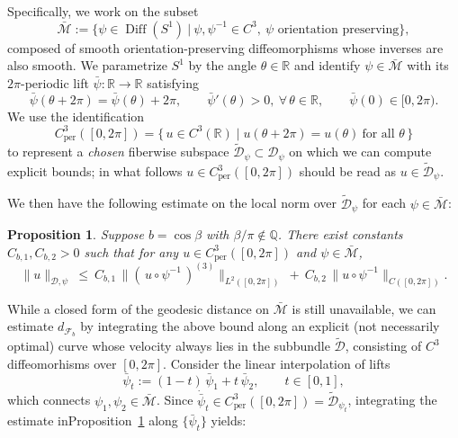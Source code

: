 \documentclass[12pt]{amsart}
\numberwithin{equation}{section}
\newtheorem{proposition}{Proposition}[section]
\theoremstyle{remark}
\begin{document}
Specifically, we work on the subset
\[
\bar{\mathcal M}:=\big\{\psi\in \operatorname{Diff}(S^1)\ \big|\ \psi,\psi^{-1}\in C^3,\ \psi \text{ orientation preserving}\big\},
\]
composed of smooth orientation-preserving diffeomorphisms whose inverses are also smooth.
We parametrize \(S^1\) by the angle \(\theta\in\mathbb R\) and identify \(\psi\in\bar{\mathcal M}\) with its \(2\pi\)-periodic lift \(\bar\psi:\mathbb R\to\mathbb R\) satisfying
\begin{equation}
\bar\psi(\theta+2\pi)=\bar\psi(\theta)+2\pi,\qquad \bar\psi'(\theta)>0,\ \forall\,\theta\in\mathbb R,\qquad \bar\psi(0)\in[0,2\pi).
\end{equation}
We use the identification
\begin{equation}
C_{\operatorname{per}}^3([0,2\pi])=\{\,u\in C^3(\mathbb R)\mid u(\theta+2\pi)=u(\theta)\ \text{for all }\theta\,\}
\end{equation}
to represent a \emph{chosen} fiberwise subspace \(\widetilde{\mathcal D}_\psi\subset \mathcal D_\psi\) on which we can compute explicit bounds; in what follows \(u\in C_{\operatorname{per}}^3([0,2\pi])\) should be read as \(u\in \widetilde{\mathcal D}_\psi\).

We then have the following estimate on the local norm over \(\widetilde{\mathcal D}_\psi\) for each \(\psi\in\bar{\mathcal M}\):
\begin{proposition}
\label{prop:S1_local_bound}
Suppose \(b=\cos\beta\) with \(\beta/\pi\notin\mathbb Q\).
There exist constants \(C_{b,1},C_{b,2}>0\) such that for any \(u\in C_{\operatorname{per}}^3([0,2\pi])\) and \(\psi\in\bar{\mathcal M}\),
\begin{equation}
\|u\|_{\mathcal D,\psi}\ \le\ C_{b,1}\,\big\|(\,u\circ \psi^{-1}\,)^{(3)}\big\|_{L^2([0,2\pi])}
\ +\ C_{b,2}\,\big\|u\circ \psi^{-1}\big\|_{C([0,2\pi])}.
\end{equation}
\end{proposition}

\noindent
While a closed form of the geodesic distance on \(\bar{\mathcal M}\) is still unavailable, we can estimate \(d_{\mathcal F_b}\) by integrating the above bound along an explicit (not necessarily optimal) curve whose velocity always lies in the subbundle \(\widetilde{\mathcal D} \), consisting of $C^3$ diffeomorhisms over $[0,2\pi]$. Consider the linear interpolation of lifts
\begin{equation}
\bar\psi_t:=(1-t)\,\bar\psi_1+t\,\bar\psi_2,\qquad t\in[0,1],
\end{equation}
which connects \(\psi_1,\psi_2\in\bar{\mathcal M}\). Since \(\dot{\bar\psi}_t\in C_{\operatorname{per}}^3([0,2\pi])=\widetilde{\mathcal D}_{\psi_t}\), integrating the estimate inProposition~\ref{prop:S1_local_bound} along \(\{\bar\psi_t\}\) yields:
\end{document}
